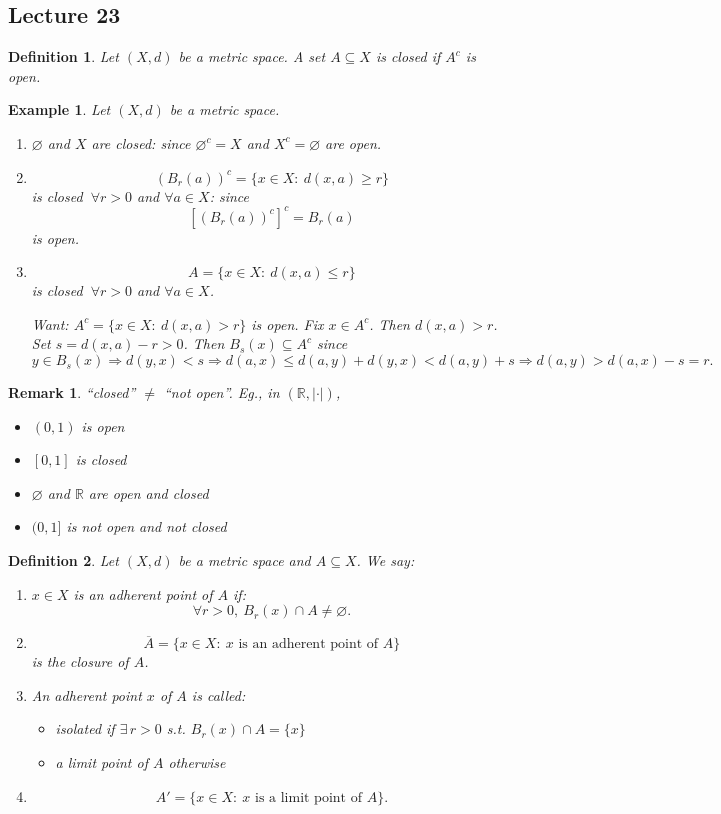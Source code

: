 \documentclass[12pt]{article}
\newtheorem*{remark}{Remark}
\newtheorem{definition}{Definition}
\newtheorem{example}{Example}
\begin{document}
\subsection*{Lecture 23}

\begin{definition}
Let $(X,d)$ be a metric space. A set $A\subseteq X$ is closed if $A^c$ is open.
\end{definition}

\begin{example}
Let $(X,d)$ be a metric space.
\begin{enumerate}[label=\textbf{(\arabic*)}]
  \item $\varnothing$ and $X$ are closed: since $\varnothing^c=X$ and
  $X^c=\varnothing$ are open.
  \item
  \[
  (B_r(a))^c=\{x\in X:\ d(x,a)\ge r\}
  \]
  is closed $\ \forall r>0$ and $\forall a\in X$: since
  \[
  [(B_r(a))^c]^c=B_r(a)
  \]
  is open.
  \item
  \[
  A=\{x\in X:\ d(x,a)\le r\}
  \]
  is closed $\ \forall r>0$ and $\forall a\in X$.

  Want: $A^c=\{x\in X:\ d(x,a)>r\}$ is open. Fix $x\in A^c$. Then $d(x,a)>r$.
  Set $s=d(x,a)-r>0$. Then $B_s(x)\subseteq A^c$ since
  \[
  y\in B_s(x)\Rightarrow d(y,x)<s
  \Rightarrow d(a,x)\le d(a,y)+d(y,x)<d(a,y)+s
  \Rightarrow d(a,y)>d(a,x)-s=r.
  \]
\end{enumerate}
\end{example}

\begin{remark}
``closed'' $\neq$ ``not open''. Eg., in $(\mathbb{R},|\cdot|)$,
\begin{itemize}
  \item $(0,1)$ is open
  \item $[0,1]$ is closed
  \item $\varnothing$ and $\mathbb{R}$ are open and closed
  \item $(0,1]$ is not open and not closed
\end{itemize}
\end{remark}

\begin{definition}
Let $(X,d)$ be a metric space and $A\subseteq X$. We say:
\begin{enumerate}[label=\textbf{(\arabic*)}]
  \item $x\in X$ is an adherent point of $A$ if:
  \[
  \forall r>0,\ B_r(x)\cap A\neq\varnothing.
  \]
  \item
  \[
  \overline{A}=\{x\in X:\ x \text{ is an adherent point of } A\}
  \]
  is the closure of $A$.
  \item An adherent point $x$ of $A$ is called:
  \begin{itemize}
    \item isolated if $\exists\, r>0$ s.t. $B_r(x)\cap A=\{x\}$
    \item a limit point of $A$ otherwise
  \end{itemize}
  \item
  \[
  A'=\{x\in X:\ x \text{ is a limit point of } A\}.
  \]
\end{enumerate}
\end{definition}
\end{document}
